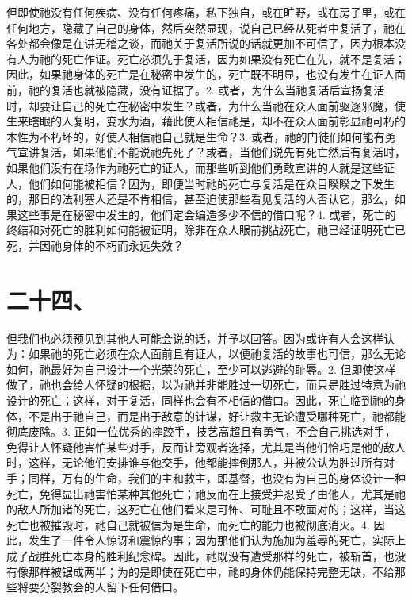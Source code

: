 但即使祂没有任何疾病、没有任何疼痛，私下独自，或在旷野，或在房子里，或在任何地方，隐藏了自己的身体，然后突然显现，说自己已经从死者中复活了，祂在各处都会像是在讲无稽之谈，而祂关于复活所说的话就更加不可信了，因为根本没有人为祂的死亡作证。死亡必须先于复活，因为如果没有死亡在先，就不是复活；因此，如果祂身体的死亡是在秘密中发生的，死亡既不明显，也没有发生在证人面前，祂的复活也就被隐藏，没有证据了。2. 或者，为什么当祂复活后宣扬复活时，却要让自己的死亡在秘密中发生？或者，为什么当祂在众人面前驱逐邪魔，使生来瞎眼的人复明，变水为酒，藉此使人相信祂是，却不在众人面前彰显祂可朽的本性为不朽坏的，好使人相信祂自己就是生命？3. 或者，祂的门徒们如何能有勇气宣讲复活，如果他们不能说祂先死了？或者，当他们说先有死亡然后有复活时，如果他们没有在场作为祂死亡的证人，而那些听到他们勇敢宣讲的人就是这些证人，他们如何能被相信？因为，即便当时祂的死亡与复活是在众目睽睽之下发生的，那日的法利塞人还是不肯相信，甚至迫使那些看见复活的人否认它，那么，如果这些事是在秘密中发生的，他们定会编造多少不信的借口呢？4. 或者，死亡的终结和对死亡的胜利如何能被证明，除非在众人眼前挑战死亡，祂已经证明死亡已死，并因祂身体的不朽而永远失效？\par


\section{二十四、}

但我们也必须预见到其他人可能会说的话，并予以回答。因为或许有人会这样认为：如果祂的死亡必须在众人面前且有证人，以便祂复活的故事也可信，那么无论如何，祂最好为自己设计一个光荣的死亡，至少可以逃避的耻辱。2. 但即使这样做了，祂也会给人怀疑的根据，以为祂并非能胜过一切死亡，而只是胜过特意为祂设计的死亡；这样，对于复活，同样也会有不相信的借口。因此，死亡临到祂的身体，不是出于祂自己，而是出于敌意的计谋，好让救主无论遭受哪种死亡，祂都能彻底废除。3. 正如一位优秀的摔跤手，技艺高超且有勇气，不会自己挑选对手，免得让人怀疑他害怕某些对手，反而让旁观者选择，尤其是当他们恰巧是他的敌人时，这样，无论他们安排谁与他交手，他都能摔倒那人，并被公认为胜过所有对手；同样，万有的生命，我们的主和救主，即基督，也没有为自己的身体设计一种死亡，免得显出祂害怕某种其他死亡；祂反而在上接受并忍受了由他人，尤其是祂的敌人所加诸的死亡，这死亡在他们看来是可怖、可耻且不敢面对的；这样，当这死亡也被摧毁时，祂自己就被信为是生命，而死亡的能力也被彻底消灭。4. 因此，发生了一件令人惊讶和震惊的事；因为那他们认为施加为羞辱的死亡，实际上成了战胜死亡本身的胜利纪念碑。因此，祂既没有遭受那样的死亡，被斩首，也没有像那样被锯成两半；为的是即使在死亡中，祂的身体仍能保持完整无缺，不给那些将要分裂教会的人留下任何借口。\par

